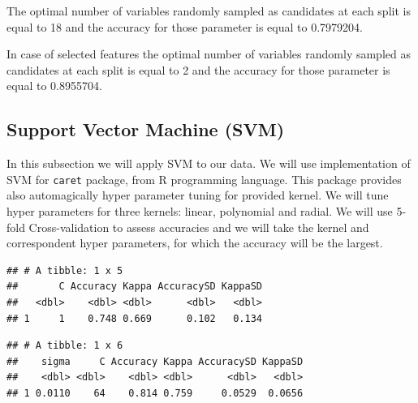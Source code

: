 \documentclass[11pt,a4paper]{article}\usepackage[]{graphicx}\usepackage[]{xcolor}
\makeatletter
\newenvironment{kframe}{%
 \def\at@end@of@kframe{}%
 \ifinner\ifhmode%
  \def\at@end@of@kframe{\end{minipage}}%
  \begin{minipage}{\columnwidth}%
 \fi\fi%
 \def\FrameCommand##1{\hskip\@totalleftmargin \hskip-\fboxsep
 \colorbox{shadecolor}{##1}\hskip-\fboxsep
     \hskip-\linewidth \hskip-\@totalleftmargin \hskip\columnwidth}%
 \MakeFramed {\advance\hsize-\width
   \@totalleftmargin\z@ \linewidth\hsize
   \@setminipage}}%
 {\par\unskip\endMakeFramed%
 \at@end@of@kframe}
\newenvironment{knitrout}{}{} %
\makeatother
\begin{document}
	

	
	The optimal number of variables randomly sampled as candidates at each split is equal to 18 and the accuracy for those parameter is equal to 0.7979204.
	

	
	


	In case of selected features the optimal number of variables randomly sampled as candidates at each split is equal to 2 and the accuracy for those parameter is equal to 0.8955704.
	
	\subsection{Support Vector Machine (SVM)}
	In this subsection we will apply SVM to our data. We will use implementation of SVM for \verb|caret| package, from R programming language. This package provides also automagically hyper parameter tuning for provided kernel. We will tune hyper parameters for three kernels: linear, polynomial and radial. We will use 5-fold Cross-validation to assess accuracies and we will take the kernel and correspondent hyper parameters, for which the accuracy will be the largest.
	

	
\begin{knitrout}
\color{fgcolor}\begin{kframe}
\begin{verbatim}
## # A tibble: 1 x 5
##       C Accuracy Kappa AccuracySD KappaSD
##   <dbl>    <dbl> <dbl>      <dbl>   <dbl>
## 1     1    0.748 0.669      0.102   0.134
\end{verbatim}
\end{kframe}
\end{knitrout}
	

	
\begin{knitrout}
\color{fgcolor}\begin{kframe}
\begin{verbatim}
## # A tibble: 1 x 6
##    sigma     C Accuracy Kappa AccuracySD KappaSD
##    <dbl> <dbl>    <dbl> <dbl>      <dbl>   <dbl>
## 1 0.0110    64    0.814 0.759     0.0529  0.0656
\end{verbatim}
\end{kframe}
\end{knitrout}
	
\end{document}
